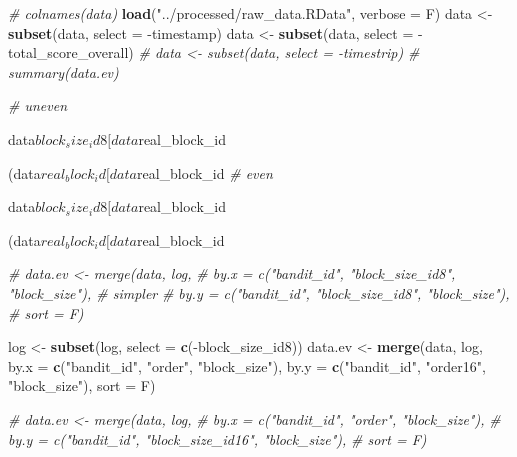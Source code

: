 \documentclass[11pt,,]{article}
\newenvironment{Shaded}{\begin{snugshade}}{\end{snugshade}}
\newcommand{\KeywordTok}[1]{\textcolor[rgb]{0.13,0.29,0.53}{\textbf{{#1}}}}
\newcommand{\DataTypeTok}[1]{\textcolor[rgb]{0.13,0.29,0.53}{{#1}}}
\newcommand{\DecValTok}[1]{\textcolor[rgb]{0.00,0.00,0.81}{{#1}}}
\newcommand{\StringTok}[1]{\textcolor[rgb]{0.31,0.60,0.02}{{#1}}}
\newcommand{\CommentTok}[1]{\textcolor[rgb]{0.56,0.35,0.01}{\textit{{#1}}}}
\newcommand{\NormalTok}[1]{{#1}}
\begin{document}
\begin{Shaded}
\begin{Highlighting}[]
\CommentTok{# colnames(data)}
\KeywordTok{load}\NormalTok{(}\StringTok{"../processed/raw_data.RData"}\NormalTok{, }\DataTypeTok{verbose =} \NormalTok{F)}
\NormalTok{data <-}\StringTok{ }\KeywordTok{subset}\NormalTok{(data, }\DataTypeTok{select =} \NormalTok{-timestamp)}
\NormalTok{data <-}\StringTok{ }\KeywordTok{subset}\NormalTok{(data, }\DataTypeTok{select =} \NormalTok{-total_score_overall)}
\CommentTok{# data <- subset(data, select = -timestrip)}
\CommentTok{# summary(data.ev)}

\CommentTok{# uneven}
\NormalTok{data$block_size_id8[data$real_block_id %%}\StringTok{ }\DecValTok{2} \NormalTok{==}\StringTok{ }\DecValTok{1}\NormalTok{] =}
\StringTok{    }\NormalTok{(data$real_block_id[data$real_block_id %%}\StringTok{ }\DecValTok{2} \NormalTok{==}\StringTok{ }\DecValTok{1}\NormalTok{] +}\StringTok{ }\DecValTok{1}\NormalTok{)/}\DecValTok{2}
\CommentTok{# even}
\NormalTok{data$block_size_id8[data$real_block_id %%}\StringTok{ }\DecValTok{2} \NormalTok{==}\StringTok{ }\DecValTok{0}\NormalTok{] =}
\StringTok{    }\NormalTok{(data$real_block_id[data$real_block_id %%}\StringTok{ }\DecValTok{2} \NormalTok{==}\StringTok{ }\DecValTok{0}\NormalTok{])/}\DecValTok{2}

\CommentTok{# data.ev <- merge(data, log,}
\CommentTok{#                by.x = c("bandit_id", "block_size_id8", "block_size"), # simpler }
\CommentTok{#                by.y = c("bandit_id", "block_size_id8", "block_size"), }
\CommentTok{#                sort = F)}

\NormalTok{log <-}\StringTok{ }\KeywordTok{subset}\NormalTok{(log, }\DataTypeTok{select =} \KeywordTok{c}\NormalTok{(-block_size_id8))}
\NormalTok{data.ev <-}\StringTok{ }\KeywordTok{merge}\NormalTok{(data, log,}
                 \DataTypeTok{by.x =} \KeywordTok{c}\NormalTok{(}\StringTok{"bandit_id"}\NormalTok{, }\StringTok{"order"}\NormalTok{, }\StringTok{"block_size"}\NormalTok{), }
                 \DataTypeTok{by.y =} \KeywordTok{c}\NormalTok{(}\StringTok{"bandit_id"}\NormalTok{, }\StringTok{"order16"}\NormalTok{, }\StringTok{"block_size"}\NormalTok{), }
                 \DataTypeTok{sort =} \NormalTok{F)}

\CommentTok{# data.ev <- merge(data, log,}
\CommentTok{#                by.x = c("bandit_id", "order", "block_size"), }
\CommentTok{#                by.y = c("bandit_id", "block_size_id16", "block_size"), }
\CommentTok{#                sort = F)}

}}}}
\end{Highlighting}
\end{Shaded}
\end{document}
